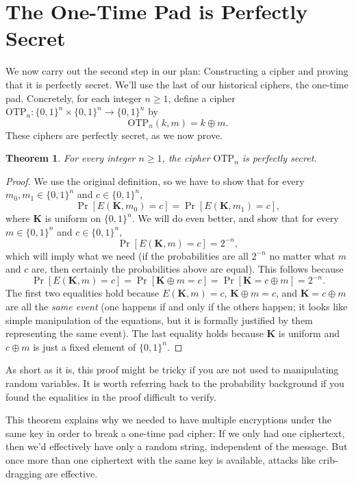 \documentclass[11pt]{article}
\newtheorem{theorem}{Theorem}
\newcommand{\enc}{E}
\newcommand{\bits}{\{0,1\}}
\newcommand{\bK}{\mathbf{K}}
\newcommand{\otp}{\mathrm{OTP}}
\begin{document}
\section{The One-Time Pad is Perfectly Secret}

We now carry out the second step in our plan: Constructing a cipher and proving
that it is perfectly secret. We'll use the last of our historical ciphers, the
one-time pad.  Concretely, for each integer $n\geq 1$, define a cipher
$\otp_n : \bits^n\times\bits^n \to \bits^n$ by
\[
    \otp_n(k,m) = k \oplus m.
\]
These ciphers are perfectly secret, as we now prove.
\begin{theorem}
    For every integer $n\geq 1$, the cipher $\otp_n$ is perfectly secret.
\end{theorem}
\begin{proof} We use the original definition, so we have to show that for every
    $m_0,m_1\in\bits^n$ and $c\in\bits^n$,
    \[
        \Pr[\enc(\bK,m_0) = c] = \Pr[\enc(\bK,m_1) = c],
    \]
    where $\bK$ is uniform on $\bits^n$.  We will do even better, and show that
    for every $m\in\bits^n$ and $c\in\bits^n$,
    \[
        \Pr[\enc(\bK,m) = c] = 2^{-n}, 
    \]
        which will imply what we need (if the probabilities are all $2^{-n}$ no
        matter what $m$ and $c$ are, then certainly the probabilities above are
        equal). This follows because
    \[
        \Pr[\enc(\bK,m) = c] = \Pr[\bK\oplus m=c] = \Pr[\bK=c\oplus m] = 2^{-n}.
    \]
    The first two equalities hold because $\enc(\bK,m)=c$, $\bK\oplus m = c$,
    and $\bK=c\oplus m$ are all the \emph{same event} (one happens if and only
    if the others happen; it looks like simple manipulation of the equations,
    but it is formally justified by them representing the same event). The last
    equality holds because $\bK$ is uniform and $c\oplus m$ is just a fixed
    element of $\bits^n$.
\end{proof}
As short as it is, this proof might be tricky if you are not used to
manipulating random variables. It is worth referring back to the probability
background if you found the equalities in the proof difficult to verify.

This theorem explains why we needed to have multiple encryptions under the same
key in order to break a one-time pad cipher: If we only had one ciphertext,
then we'd effectively have only a random string, independent of the message.
But once more than one ciphertext with the same key is available, attacks like
crib-dragging are effective.
\end{document}
